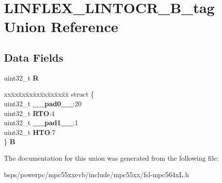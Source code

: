 \hypertarget{unionLINFLEX__LINTOCR__32B__tag}{}\section{L\+I\+N\+F\+L\+E\+X\+\_\+\+L\+I\+N\+T\+O\+C\+R\+\_\+B\+\_\+tag Union Reference}
\label{unionLINFLEX__LINTOCR__32B__tag}
\subsection*{Data Fields}
\begin{DoxyCompactItemize}
\item 
\mbox{\label{unionLINFLEX__LINTOCR__32B__tag_a8a2c62ac19e04c044c8add72e419220b}} 
uint32\+\_\+t {\bfseries R}
\item 
\mbox{\label{unionLINFLEX__LINTOCR__32B__tag_a96165c426a871b20a860a183ec40460e}} 
\begin{tabbing}
xx\=xx\=xx\=xx\=xx\=xx\=xx\=xx\=xx\=\kill
struct \{\\
\>uint32\_t {\bfseries \_\_pad0\_\_}:20\\
\>uint32\_t {\bfseries RTO}:4\\
\>uint32\_t {\bfseries \_\_pad1\_\_}:1\\
\>uint32\_t {\bfseries HTO}:7\\
\} {\bfseries B}\\

\end{tabbing}\end{DoxyCompactItemize}


The documentation for this union was generated from the following file\+:\begin{DoxyCompactItemize}
\item 
bsps/powerpc/mpc55xxevb/include/mpc55xx/fsl-\/mpc564x\+L.\+h\end{DoxyCompactItemize}
